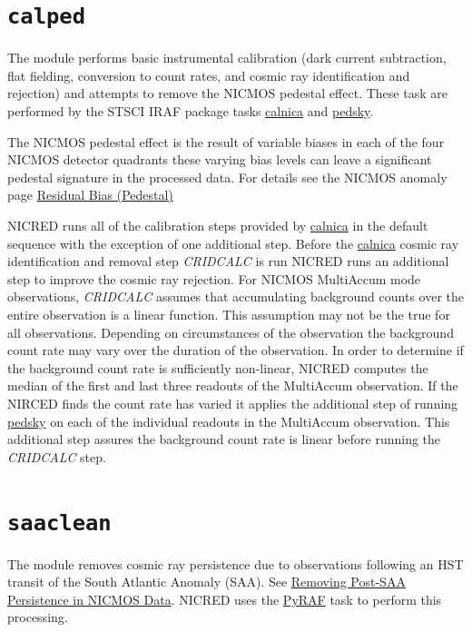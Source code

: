 \documentclass[letterpaper,10pt,english]{sphinxmanual}
\begin{document}

\section{\texttt{calped}}
\label{modules:index-4}\label{modules:calped}
The  module performs basic instrumental calibration (dark current subtraction, flat fielding,
conversion to count rates, and cosmic ray identification and rejection) and attempts to remove
the NICMOS pedestal effect. These task are performed by the STSCI IRAF package tasks \href{http://stsdas.stsci.edu/cgi-bin/gethelp.cgi?calnica}{calnica} and \href{http://stsdas.stsci.edu/cgi-bin/gethelp.cgi?pedsky.hlp}{pedsky}.

The NICMOS pedestal effect is the result of variable biases in each of the four NICMOS detector quadrants these
varying bias levels can leave a significant pedestal signature in the processed data. For details see the
NICMOS anomaly page \href{http://www.stsci.edu/hst/nicmos/performance/anomalies/pedestal.html}{Residual Bias (Pedestal)}

NICRED runs all of the calibration steps provided by \href{http://stsdas.stsci.edu/cgi-bin/gethelp.cgi?calnica}{calnica} in the default sequence with the exception of one
additional step. Before the \href{http://stsdas.stsci.edu/cgi-bin/gethelp.cgi?calnica}{calnica} cosmic ray identification and removal step \emph{CRIDCALC} is run NICRED runs an
additional step to improve the cosmic ray rejection. For NICMOS MultiAccum mode observations, \emph{CRIDCALC} assumes
that accumulating background counts over the entire observation is a linear function. This assumption may not
be the true for all observations. Depending on circumstances of the observation the background
count rate may vary over the duration of the observation. In order to determine if the background count rate
is sufficiently non-linear, NICRED computes the median of the first and last three readouts of the MultiAccum
observation.  If the NIRCED finds the count rate has varied it applies the additional step of running \href{http://stsdas.stsci.edu/cgi-bin/gethelp.cgi?pedsky.hlp}{pedsky}
on each of the individual readouts in the MultiAccum observation. This additional step assures the background
count rate is linear before running the \emph{CRIDCALC} step.


\section{\texttt{saaclean}}
\label{modules:saaclean}\label{modules:index-5}
The  module removes cosmic ray persistence due to observations following an HST transit of
the South Atlantic Anomaly (SAA). See \href{http://www.stsci.edu/hst/nicmos/documents/isrs/isr\_2007\_001.pdf}{Removing Post-SAA Persistence in NICMOS Data}.
NICRED uses the \href{http://www.stsci.edu/resources/software\_hardware/pyraf}{PyRAF} task  to perform this processing.
\end{document}
